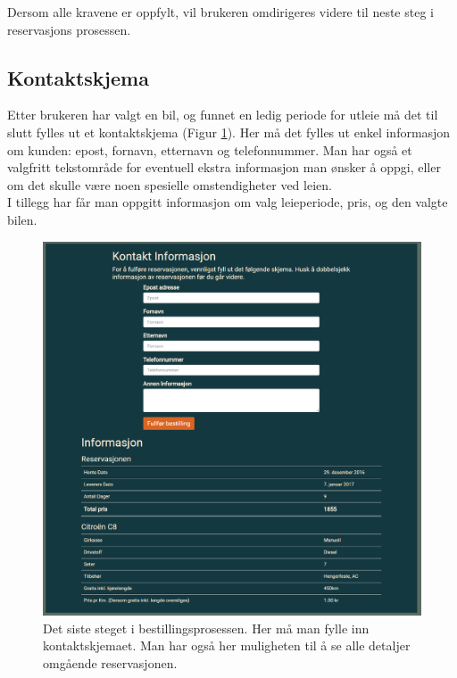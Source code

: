 Dersom alle kravene er oppfylt, vil brukeren omdirigeres videre til neste steg i reservasjons prosessen.




\subsection{Kontaktskjema}
Etter brukeren har valgt en bil, og funnet en ledig periode for utleie må det til slutt fylles ut et kontaktskjema (Figur \ref{fig:rv_customercontact}). Her må det fylles ut enkel informasjon om kunden: epost, fornavn, etternavn og telefonnummer. Man har også et valgfritt tekstområde for eventuell ekstra informasjon man ønsker å oppgi, eller om det skulle være noen spesielle omstendigheter ved leien.
\\
I tillegg har får man oppgitt informasjon om valg leieperiode, pris, og den valgte bilen. 

 \begin{figure}[htbp]
	\centering
		\includegraphics[scale=0.5]{Bilder/rv_customercontact.png}
	\caption[Kontaktskjema]{Det siste steget i bestillingsprosessen. Her må man fylle inn kontaktskjemaet. Man har også her muligheten til å se alle detaljer omgående reservasjonen.} %
	\label{fig:rv_customercontact}
\end{figure}


